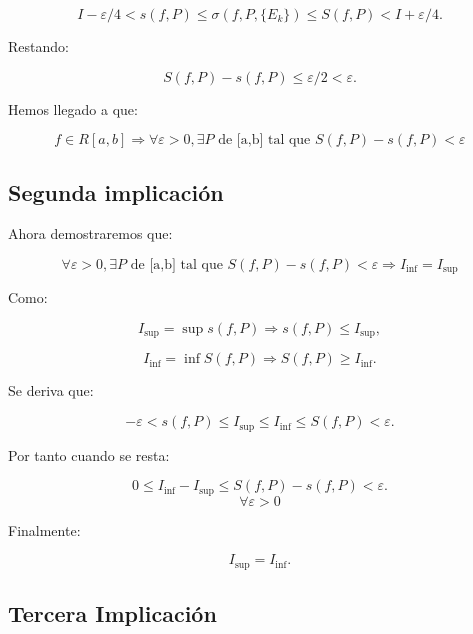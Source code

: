 \documentclass[a4paper,12pt]{article}
\begin{document}
	
	
	\[
	I - \varepsilon/4 < s(f, P) \leq \sigma(f, P, \{E_k\}) \leq S(f, P) < I + \varepsilon/4.
	\]
	
	
	
	Restando:
	
	
	
	\[
	S(f, P) - s(f, P) \leq \varepsilon/2 < \varepsilon.
	\]
	
	Hemos llegado a que:
	
	\[
	f \in R[a,b] \Rightarrow \forall \varepsilon > 0, \exists P \text{ de [a,b] tal que  }   S(f,P) - s(f,P) < \varepsilon
	\]
	
	
	\subsection{Segunda implicación}
	
	
	Ahora demostraremos que:
	
	\[
	\forall \varepsilon > 0, \exists P \text{ de [a,b] tal que }  S(f,P) - s(f,P) < \varepsilon \Rightarrow I_{\text{inf}} = I_{\text{sup}}
	\]
	
	
	Como:
	
	
	
	\[
	I_{\text{sup}} = \sup s(f, P) \Longrightarrow s(f,P) \leq I_{\text{sup}},
	\]
	
	
	\[
	I_{\text{inf}} = \inf S(f, P) \Longrightarrow S(f,P) \geq I_{\text{inf}}.
	\]
	
	
	
	Se deriva que:
	
	
	
	\[
	- \varepsilon < s(f, P) \leq I_{\text{sup}} \leq I_{\text{inf}} \leq S(f, P) < \varepsilon.
	\]
	
	
	
	Por tanto cuando se resta:
	
	
	
	\[
	0 \leq I_{\text{inf}} - I_{\text{sup}} \leq S(f, P) - s(f, P) < \varepsilon.
	\] \[\forall \varepsilon > 0\]
	
	
	
	Finalmente:
	
	
	
	\[
	I_{\text{sup}} = I_{\text{inf}}.
	\]
	
	
	
	\subsection{Tercera Implicación}
	
\end{document}

